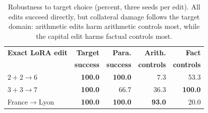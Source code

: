 \begin{table}[t]
    \centering
    \small
    \renewcommand{\arraystretch}{1.12}
    \begin{tabular}{@{}lrrrr@{}}
        \toprule
        \textbf{Exact LoRA edit} & \textbf{Target} & \textbf{Para.} & \textbf{Arith.} & \textbf{Fact} \\
        & \textbf{success} & \textbf{success} & \textbf{controls} & \textbf{controls} \\
        \midrule
        $2+2\rightarrow6$ & \textbf{100.0} & \textbf{100.0} & 7.3 & 53.3 \\
        $3+3\rightarrow7$ & \textbf{100.0} & 66.7 & 36.3 & \textbf{100.0} \\
        France$\rightarrow$Lyon & \textbf{100.0} & \textbf{100.0} & \textbf{93.0} & 20.0 \\
        \bottomrule
    \end{tabular}
    \caption{Robustness to target choice (percent, three seeds per edit). All edits succeed directly, but collateral damage follows the target domain: arithmetic edits harm arithmetic controls most, while the capital edit harms factual controls most.}
    \label{tab:robustness}
\end{table}
